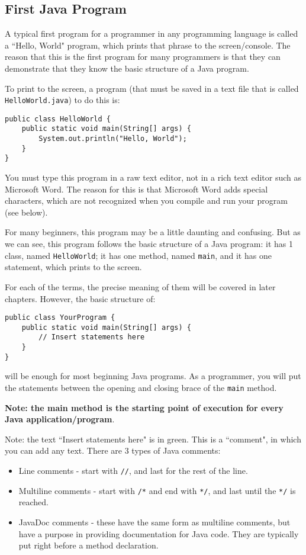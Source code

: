 \subsection{First Java Program}
A typical first program for a programmer in any programming language is called a ``Hello, World" program, which prints that phrase to the screen/console. The reason that this is the first program for many programmers is that they can demonstrate that they know the basic structure of a Java program. 

\par To print to the screen, a program (that must be saved in a text file that is called \texttt{HelloWorld.java}) to do this is:
\begin{lstlisting}
public class HelloWorld {
	public static void main(String[] args) {
		System.out.println("Hello, World");
	}
}
\end{lstlisting}
You must type this program in a raw text editor, not in a rich text editor such as Microsoft Word. The reason for this is that Microsoft Word adds special characters, which are not recognized when you compile and run your program (see below).

\par For many beginners, this program may be a little daunting and confusing. But as we can see, this program follows the basic structure of a Java program: it has 1 class, named \texttt{HelloWorld}; it has one method, named \texttt{main}, and it has one statement, which prints to the screen. 

\par For each of the terms, the precise meaning of them will be covered in later chapters. However, the basic structure of:
\begin{lstlisting}
public class YourProgram {
	public static void main(String[] args) {
		// Insert statements here
	}
}
\end{lstlisting}
will be enough for most beginning Java programs. As a programmer, you will put the statements between the opening and closing brace of the \verb|main| method.

\par \textbf{Note: the main method is the starting point of execution for every Java application/program}.

\par Note: the text ``Insert statements here" is in green. This is a ``comment", in which you can add any text. There are 3 types of Java comments:

\begin{itemize}
\item Line comments - start with \verb|//|, and last for the rest of the line.
\item Multiline comments - start with \verb|/*| and end with \verb|*/|, and last until the \verb|*/| is reached.
\item JavaDoc comments - these have the same form as multiline comments, but have a purpose in providing documentation for Java code. They are typically put right before a method declaration.
\end{itemize}

